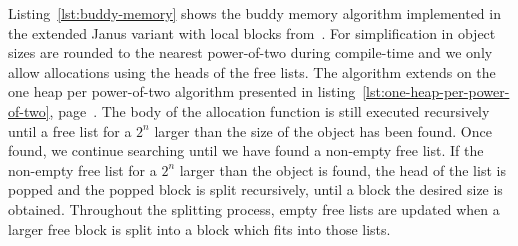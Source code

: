 Listing~\ref{lst:buddy-memory} shows the buddy memory algorithm implemented in the extended Janus variant with local blocks from~\cite{ty:ejanus}. For simplification in object sizes are rounded to the nearest power-of-two during compile-time and we only allow allocations using the heads of the free lists. The algorithm extends on the one heap per power-of-two algorithm presented in listing~\ref{lst:one-heap-per-power-of-two}, page~\pageref{lst:one-heap-per-power-of-two}.
The body of the allocation function is still executed recursively until a free list for a $2^n$ larger than the size of the object has been found. Once found, we continue searching until we have found a non-empty free list. If the non-empty free list for a $2^n$ larger than the object is found, the head of the list is popped and the popped block is split recursively, until a block the desired size is obtained. Throughout the splitting process, empty free lists are updated when a larger free block is split into a block which fits into those lists. 
